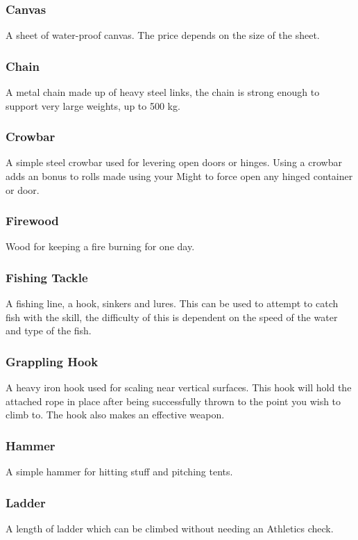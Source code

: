 \subsubsection*{Canvas}
A sheet of water-proof canvas. The price depends on the size of the sheet.

\subsubsection*{Chain}
A metal chain made up of heavy steel links, the chain is strong enough to support very large weights, up to 500 kg.

\subsubsection*{Crowbar}
A simple steel crowbar used for levering open doors or hinges. Using a crowbar adds an  bonus to rolls made using your Might to force open any hinged container or door.

\subsubsection*{Firewood}
Wood for keeping a fire burning for one day.

\subsubsection*{Fishing Tackle}
A fishing line, a hook, sinkers and lures. This can be used to attempt to catch fish with the  skill, the difficulty of this is dependent on the speed of the water and type of the fish.

\subsubsection*{Grappling Hook}
A heavy iron hook used for scaling near vertical surfaces. This hook will hold the attached rope in place after being successfully thrown to the point you wish to climb to. The hook also makes an effective weapon.

\subsubsection*{Hammer}
A simple hammer for hitting stuff and pitching tents.

\subsubsection*{Ladder}
A length of ladder which can be climbed without needing an Athletics check.


